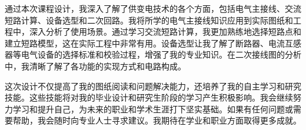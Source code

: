 \acknowledgement
通过本次课程设计，我深入了解了供变电技术的各个方面，包括电气主接线、交流短路计算、设备选型和二次回路。我将所学的电气主接线知识应用到实际图纸和工程中，深入分析了使用场景。通过学习交流短路计算，我更加熟练地选择短路点和建立短路模型，这在实际工程中非常有用。设备选型让我了解了断路器、电流互感器等电气设备的选择标准和校验过程，增强了我的专业知识。在二次接线图的分析中，我清晰了解了各功能的实现方式和电路构成。

这次设计不仅提高了我的图纸阅读和问题解决能力，还培养了我的自主学习和研究技能。这些技能将对我的毕业设计和研究生阶段的学习产生积极影响。我会继续努力学习和提升自己，为未来的职业和学术生涯打下坚实基础。如果有任何问题或需要帮助，我会随时向专业人士寻求建议。我期待在学业和职业方面取得更多成就。